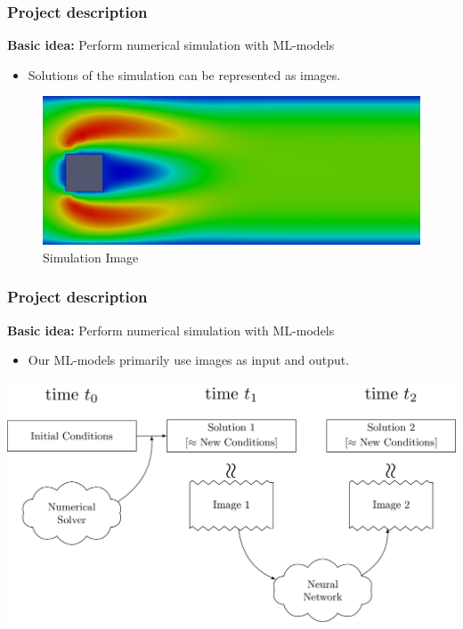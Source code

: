 \documentclass[18pt]{beamer}
\begin{document}
\begin{frame}[t]
  \frametitle{Project description}
  \begin{center}
    \large{\textbf{Basic idea:} Perform numerical simulation with ML-models}
  \end{center}
  \begin{itemize}
  \item Solutions of the simulation can be represented as images.
  \end{itemize}

  \begin{figure}[htb]
    \includegraphics[scale=0.38]{images/flow_solution}
    \caption{Simulation Image}
  \end{figure}

  
\end{frame}


\begin{frame}[t]
  \frametitle{Project description}
  \begin{center}
    \large{\textbf{Basic idea:} Perform numerical simulation with ML-models}
  \end{center}
  
  \begin{itemize}
  \item Our ML-models primarily use images as input and output.
  \end{itemize}

  \begin{center}
    \includegraphics[scale=0.15]{images/new/overview}
  \end{center}
  
\end{frame}
\end{document}
